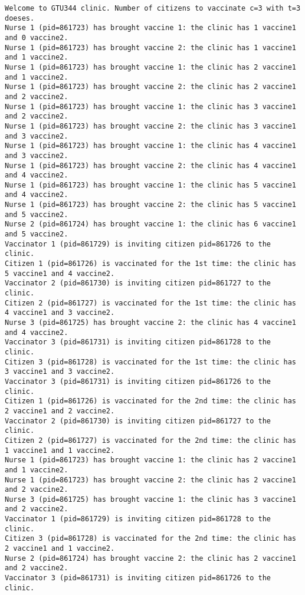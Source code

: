 \documentclass[a4paper]{article}
\begin{document}
\begin{verbatim}
Welcome to GTU344 clinic. Number of citizens to vaccinate c=3 with t=3 doeses.
Nurse 1 (pid=861723) has brought vaccine 1: the clinic has 1 vaccine1 and 0 vaccine2.
Nurse 1 (pid=861723) has brought vaccine 2: the clinic has 1 vaccine1 and 1 vaccine2.
Nurse 1 (pid=861723) has brought vaccine 1: the clinic has 2 vaccine1 and 1 vaccine2.
Nurse 1 (pid=861723) has brought vaccine 2: the clinic has 2 vaccine1 and 2 vaccine2.
Nurse 1 (pid=861723) has brought vaccine 1: the clinic has 3 vaccine1 and 2 vaccine2.
Nurse 1 (pid=861723) has brought vaccine 2: the clinic has 3 vaccine1 and 3 vaccine2.
Nurse 1 (pid=861723) has brought vaccine 1: the clinic has 4 vaccine1 and 3 vaccine2.
Nurse 1 (pid=861723) has brought vaccine 2: the clinic has 4 vaccine1 and 4 vaccine2.
Nurse 1 (pid=861723) has brought vaccine 1: the clinic has 5 vaccine1 and 4 vaccine2.
Nurse 1 (pid=861723) has brought vaccine 2: the clinic has 5 vaccine1 and 5 vaccine2.
Nurse 2 (pid=861724) has brought vaccine 1: the clinic has 6 vaccine1 and 5 vaccine2.
Vaccinator 1 (pid=861729) is inviting citizen pid=861726 to the clinic.
Citizen 1 (pid=861726) is vaccinated for the 1st time: the clinic has 5 vaccine1 and 4 vaccine2. 
Vaccinator 2 (pid=861730) is inviting citizen pid=861727 to the clinic.
Citizen 2 (pid=861727) is vaccinated for the 1st time: the clinic has 4 vaccine1 and 3 vaccine2. 
Nurse 3 (pid=861725) has brought vaccine 2: the clinic has 4 vaccine1 and 4 vaccine2.
Vaccinator 3 (pid=861731) is inviting citizen pid=861728 to the clinic.
Citizen 3 (pid=861728) is vaccinated for the 1st time: the clinic has 3 vaccine1 and 3 vaccine2. 
Vaccinator 3 (pid=861731) is inviting citizen pid=861726 to the clinic.
Citizen 1 (pid=861726) is vaccinated for the 2nd time: the clinic has 2 vaccine1 and 2 vaccine2. 
Vaccinator 2 (pid=861730) is inviting citizen pid=861727 to the clinic.
Citizen 2 (pid=861727) is vaccinated for the 2nd time: the clinic has 1 vaccine1 and 1 vaccine2. 
Nurse 1 (pid=861723) has brought vaccine 1: the clinic has 2 vaccine1 and 1 vaccine2.
Nurse 1 (pid=861723) has brought vaccine 2: the clinic has 2 vaccine1 and 2 vaccine2.
Nurse 3 (pid=861725) has brought vaccine 1: the clinic has 3 vaccine1 and 2 vaccine2.
Vaccinator 1 (pid=861729) is inviting citizen pid=861728 to the clinic.
Citizen 3 (pid=861728) is vaccinated for the 2nd time: the clinic has 2 vaccine1 and 1 vaccine2. 
Nurse 2 (pid=861724) has brought vaccine 2: the clinic has 2 vaccine1 and 2 vaccine2.
Vaccinator 3 (pid=861731) is inviting citizen pid=861726 to the clinic.

\end{verbatim}
\end{document}
